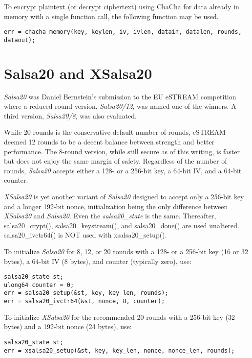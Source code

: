\documentclass[synpaper]{book}
\newcommand{\mysection}[1]    %
	{                   %
	\section{#1}
   \markboth{\textsf{www.libtom.net}}{\thesection ~ {#1}}
	}
\begin{document}
To encrypt plaintext (or decrypt ciphertext) using ChaCha for data already in
memory with a single function call, the following function may be used.
\begin{verbatim}
err = chacha_memory(key, keylen, iv, ivlen, datain, datalen, rounds, dataout);
\end{verbatim}

\mysection{Salsa20 and XSalsa20}

\textit{Salsa20} was Daniel Bernstein's submission to the EU eSTREAM
competition where a reduced-round version, \textit{Salsa20/12}, was named
one of the winners.  A third version, \textit{Salsa20/8}, was also evaluated.
\vspace{1mm}

While 20 rounds is the conservative default number of rounds, eSTREAM deemed
12 rounds to be a decent balance between strength and better performance.
The 8-round version, while still secure as of this writing, is faster but
does not enjoy the same margin of safety.  Regardless of the number of rounds,
\textit{Salsa20} accepts either a 128- or a 256-bit key, a 64-bit IV, and a
64-bit counter.
\vspace{1mm}

\textit{XSalsa20} is yet another variant of \textit{Salsa20} designed to accept
only a 256-bit key and a longer 192-bit nonce, initialization being the only
difference between \textit{XSalsa20} and \textit{Salsa20}.  Even the
\textit{salsa20\_state} is the same.  Thereafter, salsa20\_crypt(),
salsa20\_keystream(), and salsa20\_done() are used unaltered.
salsa20\_ivctr64() is NOT used with xsalsa20\_setup().
\vspace{1mm}

To initialize \textit{Salsa20} for 8, 12, or 20 rounds with a 128- or a
256-bit key (16 or 32 bytes), a 64-bit IV (8 bytes), and counter (typically
zero), use:

\begin{verbatim}
salsa20_state st;
ulong64 counter = 0;
err = salsa20_setup(&st, key, key_len, rounds);
err = salsa20_ivctr64(&st, nonce, 8, counter);
\end{verbatim}

To initialize \textit{XSalsa20} for the recommended 20 rounds with a 256-bit
key (32 bytes) and a 192-bit nonce (24 bytes), use:

\begin{verbatim}
salsa20_state st;
err = xsalsa20_setup(&st, key, key_len, nonce, nonce_len, rounds);
\end{verbatim}
\end{document}

